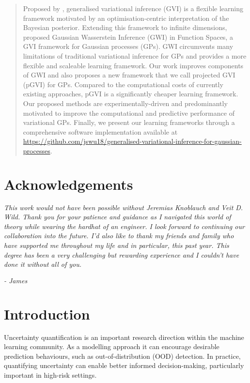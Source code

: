 \documentclass{article}
\numberwithin{equation}{section}
\begin{document}
\begin{abstract}
Proposed by \cite{knoblauch2022optimization}, generalised variational inference (GVI) is a flexible learning framework motivated by an optimisation-centric interpretation of the Bayesian posterior. 
Extending this framework to infinite dimensions, \cite{wild2022generalized} proposed Gaussian Wasserstein Inference (GWI) in Function Spaces, a GVI framework for Gaussian processes (GPs). 
GWI circumvents many limitations of traditional variational inference for GPs and provides a more flexible and scaleable learning framework.
Our work improves components of GWI and also proposes a new framework that we call projected GVI (pGVI) for GPs. 
Compared to the computational costs of currently existing approaches, pGVI is a significantly cheaper learning framework.
Our proposed methods are experimentally-driven and predominantly motivated to improve the computational and predictive performance of variational GPs. 
Finally, we present our learning frameworks through a comprehensive software implementation available at \href{https://github.com/jswu18/generalised-variational-inference-for-gaussian-processes}{https://github.com/jswu18/generalised-variational-inference-for-gaussian-processes}.
\end{abstract}

\newpage
\section*{Acknowledgements}
\textit{This work would not have been possible without Jeremias Knoblauch and Veit D. Wild. 
Thank you for your patience and guidance as I navigated this world of theory while wearing the hardhat of an engineer. 
I look forward to continuing our collaboration into the future.
I’d also like to thank my friends and family who have supported me throughout my life and in particular, this past year. 
This degree has been a very challenging but rewarding experience and I couldn’t have done it without all of you.
}

\hspace*{\fill} \textit{- James}

\newpage
\tableofcontents
\newpage
{}
\setcounter{page}{1}

\newpage
\section{Introduction}
Uncertainty quantification is an important research direction within the machine learning community.
As a modelling approach it can encourage desirable prediction behaviours, such as out-of-distribution (OOD) detection. 
In practice, quantifying uncertainty can enable better informed decision-making, particularly important in high-risk settings.
\end{document}
